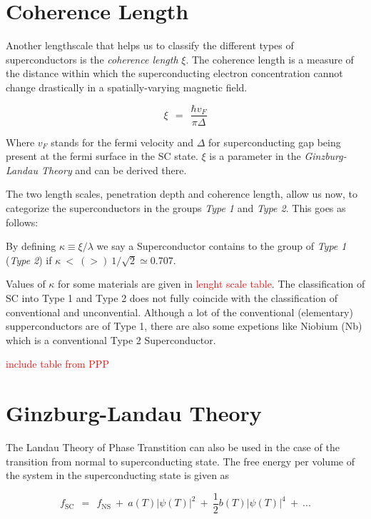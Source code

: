 \documentclass[10pt]{report}
\numberwithin{equation}{chapter}
\begin{document}
\section{Coherence Length}

Another lengthscale that helps us to classify the different types of superconductors is the \textit{coherence length} $\xi$. The coherence length is a measure of the distance within which the superconducting electron concentration cannot change drastically in a spatially-varying magnetic field.

\begin{equation} \label{eq:coherence_length}
  \xi ~~=~~ \frac{\hbar v_F}{\pi \Delta}
\end{equation}

Where $v_F$ stands for the fermi velocity and $\Delta$ for superconducting gap being present at the fermi surface in the SC state. $\xi$ is a parameter in the \textit{Ginzburg-Landau Theory} and can be derived there.

The two length scales, penetration depth and coherence length, allow us now, to categorize the superconductors in the groups \textit{Type 1} and \textit{Type 2}. This goes as follows:

By defining $\kappa \equiv \xi/\lambda$ we say a Superconductor contains to the group of \textit{Type 1} (\textit{Type 2}) if $\kappa ~<~ (>)~ 1/\sqrt{2} \simeq 0.707 $. 

Values of $\kappa$ for some materials are given in \textcolor{red}{lenght scale table}. The classification of SC into Type 1 and Type 2 does not fully coincide with the classification of conventional and unconvential. Although a lot of the conventional (elementary) supperconductors are of Type 1, there are also some expetions like Niobium (Nb) which is a conventional Type 2 Superconductor.

\textcolor{red}{include table from PPP}


\section{Ginzburg-Landau Theory}

The Landau Theory of Phase Transtition can also be used in the case of the transition from normal to superconducting state. The free energy per volume of the system in the superconducting state is given as

\begin{equation}
  f_\text{SC} ~~=~~ f_\text{NS} ~+~ a(T) |\psi(T)|^2 ~+~ \frac{1}{2} b(T) |\psi(T)|^4 ~+~ ...
\end{equation}
\end{document}
